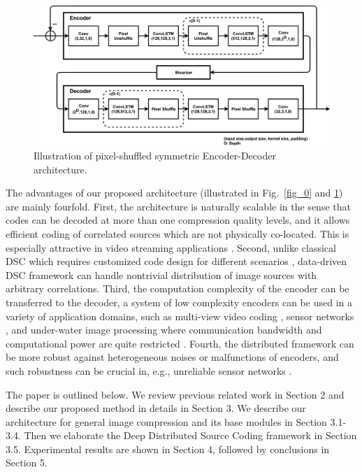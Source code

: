 \documentclass[10pt,twocolumn,letterpaper]{article}
\begin{document}
\begin{figure}
\begin{center}
\includegraphics[width=0.8\linewidth]{figure/DeepEncoderDecoder.eps}
\end{center}
   \caption{Illustration of pixel-shuffled symmetric Encoder-Decoder architecture.}
\label{fig_1}
\end{figure}
The advantages of our proposed architecture (illustrated in Fig.~\ref{fig_0} and \ref{fig_1}) are mainly fourfold. 
First, the architecture is naturally scalable in the sense that codes can be decoded at more than one compression quality levels, and it allows efficient coding of correlated sources which are not physically co-located. This is especially attractive in video streaming applications \cite{guillemot2007distributed,gehrig2008distributed}. Second, unlike classical DSC which requires customized code design for different scenarios \cite{xiong2004distributed}, data-driven DSC framework can handle nontrivial distribution of image sources with arbitrary correlations. Third, the computation complexity of the encoder can be transferred to the decoder, a system of low complexity encoders can be used in a variety of application domains, such as multi-view video coding \cite{girod2005distributed}, sensor networks \cite{xiong2004distributed}, and under-water image processing where communication bandwidth and computational power are quite restricted \cite{stojanovic2009underwater,schettini2010underwater}. Fourth, the distributed framework can be more robust against heterogeneous noises or malfunctions of encoders, and such robustness can be crucial in, e.g., unreliable sensor networks \cite{girod2005distributed,ishwar2005rate,xiao2006distributed}.

The paper is outlined below. We review previous related work in Section 2 and describe our proposed method in details in Section 3. We describe our architecture for general image compression and its base modules in Section 3.1-3.4. Then we elaborate the Deep Distributed Source Coding framework in Section 3.5. Experimental results are shown in Section 4, followed by conclusions in Section 5.
\end{document}
